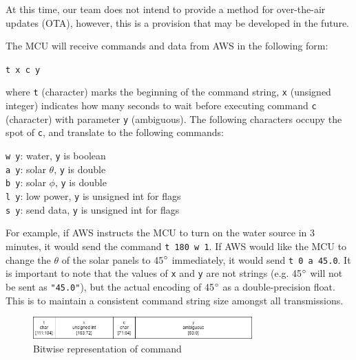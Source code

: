 \begin{flushleft}
    At this time, our team does not intend to provide a method for over-the-air
    updates (OTA), however, this is a provision that may be developed in the
    future.
\end{flushleft}
\begin{flushleft}
    The MCU will receive commands and data from AWS in the following form:
    \begin{center}
        \texttt{t x c y}
    \end{center}
    where \texttt{t} (character) marks the beginning of the command string,
    \texttt{x} (unsigned integer) indicates how many seconds to wait before
    executing command \texttt{c} (character) with parameter \texttt{y}
    (ambiguous). The following characters occupy the spot of \texttt{c}, and
    translate to the following commands:
    \begin{center}
        \texttt{w y}: water, \texttt{y} is boolean \\
        \texttt{a y}: solar $\theta$, \texttt{y} is double \\
        \texttt{b y}: solar $\phi$, \texttt{y} is double \\
        \texttt{l y}: low power, \texttt{y} is unsigned int for flags \\
        \texttt{s y}: send data, \texttt{y} is unsigned int for flags
    \end{center}
    For example, if AWS instructs the MCU to turn on the water source in 3
    minutes, it would send the command \texttt{t 180 w 1}. If AWS would like
    the MCU to change the $\theta$ of the solar panels to 45$\degree$
    immediately, it would send \texttt{t 0 a 45.0}. It is important to note
    that the values of \texttt{x} and \texttt{y} are not strings (e.g.
    45$\degree$ will not be sent as \texttt{"45.0"}), but the actual encoding
    of 45$\degree$ as a double-precision float. This is to maintain a
    consistent command string size amongst all transmissions.
    \begin{figure}[H]
        \caption{Bitwise representation of command}
        \label{command_bitwise}
        \centering
        \includegraphics[width=0.75\textwidth]{images/command_encoding.png}
    \end{figure}
\end{flushleft}
